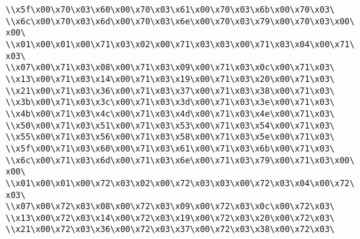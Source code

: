 \verb|\\x5f\x00\x70\x03\x60\x00\x70\x03\x61\x00\x70\x03\x6b\x00\x70\x03\|\newline
\verb|\\x6c\x00\x70\x03\x6d\x00\x70\x03\x6e\x00\x70\x03\x79\x00\x70\x03\x00\x00\|\newline
\verb|\\x01\x00\x01\x00\x71\x03\x02\x00\x71\x03\x03\x00\x71\x03\x04\x00\x71\x03\|\newline
\verb|\\x07\x00\x71\x03\x08\x00\x71\x03\x09\x00\x71\x03\x0c\x00\x71\x03\|\newline
\verb|\\x13\x00\x71\x03\x14\x00\x71\x03\x19\x00\x71\x03\x20\x00\x71\x03\|\newline
\verb|\\x21\x00\x71\x03\x36\x00\x71\x03\x37\x00\x71\x03\x38\x00\x71\x03\|\newline
\verb|\\x3b\x00\x71\x03\x3c\x00\x71\x03\x3d\x00\x71\x03\x3e\x00\x71\x03\|\newline
\verb|\\x4b\x00\x71\x03\x4c\x00\x71\x03\x4d\x00\x71\x03\x4e\x00\x71\x03\|\newline
\verb|\\x50\x00\x71\x03\x51\x00\x71\x03\x53\x00\x71\x03\x54\x00\x71\x03\|\newline
\verb|\\x55\x00\x71\x03\x56\x00\x71\x03\x58\x00\x71\x03\x5e\x00\x71\x03\|\newline
\verb|\\x5f\x00\x71\x03\x60\x00\x71\x03\x61\x00\x71\x03\x6b\x00\x71\x03\|\newline
\verb|\\x6c\x00\x71\x03\x6d\x00\x71\x03\x6e\x00\x71\x03\x79\x00\x71\x03\x00\x00\|\newline
\verb|\\x01\x00\x01\x00\x72\x03\x02\x00\x72\x03\x03\x00\x72\x03\x04\x00\x72\x03\|\newline
\verb|\\x07\x00\x72\x03\x08\x00\x72\x03\x09\x00\x72\x03\x0c\x00\x72\x03\|\newline
\verb|\\x13\x00\x72\x03\x14\x00\x72\x03\x19\x00\x72\x03\x20\x00\x72\x03\|\newline
\verb|\\x21\x00\x72\x03\x36\x00\x72\x03\x37\x00\x72\x03\x38\x00\x72\x03\|\newline
